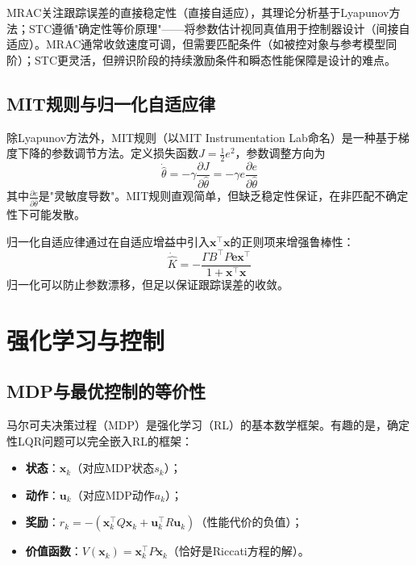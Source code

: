 \begin{remark}
MRAC关注跟踪误差的直接稳定性（直接自适应），其理论分析基于Lyapunov方法；STC遵循"确定性等价原理"——将参数估计视同真值用于控制器设计（间接自适应）。MRAC通常收敛速度可调，但需要匹配条件（如被控对象与参考模型同阶）；STC更灵活，但辨识阶段的持续激励条件和瞬态性能保障是设计的难点。
\end{remark}

\subsection{MIT规则与归一化自适应律}

除Lyapunov方法外，MIT规则（以MIT Instrumentation Lab命名）是一种基于梯度下降的参数调节方法。定义损失函数\(J = \frac{1}{2}e^2\)，参数调整方向为
\[
\dot{\hat{\theta}} = -\gamma \frac{\partial J}{\partial \hat{\theta}} = -\gamma e \frac{\partial e}{\partial \hat{\theta}}
\]
其中\(\frac{\partial e}{\partial \hat{\theta}}\)是"灵敏度导数"。MIT规则直观简单，但缺乏稳定性保证，在非匹配不确定性下可能发散。

归一化自适应律通过在自适应增益中引入\(\mathbf{x}^{\top}\mathbf{x}\)的正则项来增强鲁棒性：
\[
\dot{\hat{K}} = -\frac{\Gamma B^{\top}P\mathbf{e}\mathbf{x}^{\top}}{1 + \mathbf{x}^{\top}\mathbf{x}}
\]
归一化可以防止参数漂移，但足以保证跟踪误差的收敛。

\section{强化学习与控制}

\subsection{MDP与最优控制的等价性}

马尔可夫决策过程（MDP）是强化学习（RL）的基本数学框架。有趣的是，确定性LQR问题可以完全嵌入RL的框架：
\begin{itemize}
\item \textbf{状态}：\(\mathbf{x}_k\)（对应MDP状态\(s_k\)）；
\item \textbf{动作}：\(\mathbf{u}_k\)（对应MDP动作\(a_k\)）；
\item \textbf{奖励}：\(r_k = -(\mathbf{x}_k^{\top}Q\mathbf{x}_k + \mathbf{u}_k^{\top}R\mathbf{u}_k)\)（性能代价的负值）；
\item \textbf{价值函数}：\(V(\mathbf{x}_k) = \mathbf{x}_k^{\top}P\mathbf{x}_k\)（恰好是Riccati方程的解）。
\end{itemize}

